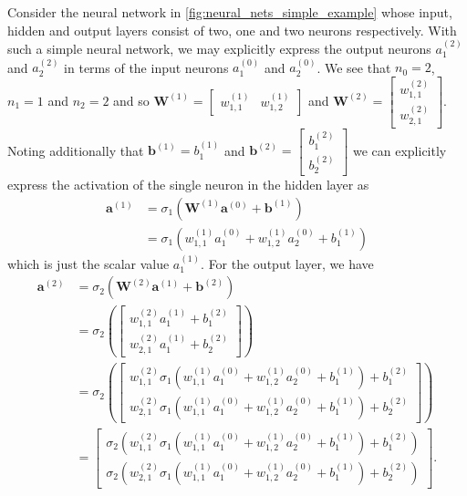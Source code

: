 \documentclass[11pt]{article}
\begin{document}
\noindent Consider the neural network in \autoref{fig:neural_nets_simple_example} whose input, hidden and output layers consist of two, one and two neurons respectively. With such a simple neural network, we may explicitly express the output neurons $a_1^{(2)}$ and $a_2^{(2)}$ in terms of the input neurons $a_1^{(0)}$ and $a_2^{(0)}$. We see that $n_0=2$, $n_1=1$ and $n_2=2$ and so
$\mathbf{W}^{(1)}=
\begin{bmatrix}
    w_{1,1}^{(1)} & w_{1,2}^{(1)}
\end{bmatrix}
$
and
$\mathbf{W}^{(2)}=
\begin{bmatrix}
    w_{1,1}^{(2)}\\
    w_{2,1}^{(2)}
\end{bmatrix}.
$
Noting additionally that $\mathbf{b}^{(1)}=b_1^{(1)}$ and
$\mathbf{b}^{(2)}=
\begin{bmatrix}
    b_{1}^{(2)}\\
    b_{2}^{(2)}
\end{bmatrix}$
we can explicitly express the activation of the single neuron in the hidden layer as
\begin{align*}
\mathbf{a}^{(1)}
&=
\sigma_1\left(\mathbf{W}^{(1)}\mathbf{a}^{(0)}+\mathbf{b}^{(1)}\right)\\
&=
\sigma_1\left(w_{1,1}^{(1)}a_1^{(0)}+w_{1,2}^{(1)}a_2^{(0)}+b_1^{(1)}\right)
\end{align*}
which is just the scalar value $a_1^{(1)}$. For the output layer, we have
\begin{align*}
\mathbf{a}^{(2)}
&=
\sigma_2\left(\mathbf{W}^{(2)}\mathbf{a}^{(1)}+\mathbf{b}^{(2)}\right)\\
&=
\sigma_2\left(
\begin{bmatrix}
    w_{1,1}^{(2)}a_1^{(1)} + b_1^{(2)}\\
    w_{2,1}^{(2)}a_1^{(1)} + b_2^{(2)}
\end{bmatrix}
\right)\\
&=
\sigma_2\left(
\begin{bmatrix}
    w_{1,1}^{(2)}\sigma_1\left(w_{1,1}^{(1)}a_1^{(0)}+w_{1,2}^{(1)}a_2^{(0)}+b_1^{(1)}\right) + b_1^{(2)}\\
    w_{2,1}^{(2)}\sigma_1\left(w_{1,1}^{(1)}a_1^{(0)}+w_{1,2}^{(1)}a_2^{(0)}+b_1^{(1)}\right) + b_2^{(2)}
\end{bmatrix}
\right)\\
&=
\begin{bmatrix}
    \sigma_2\left(w_{1,1}^{(2)}\sigma_1\left(w_{1,1}^{(1)}a_1^{(0)}+w_{1,2}^{(1)}a_2^{(0)}+b_1^{(1)}\right) + b_1^{(2)}\right)\\
    \sigma_2\left(w_{2,1}^{(2)}\sigma_1\left(w_{1,1}^{(1)}a_1^{(0)}+w_{1,2}^{(1)}a_2^{(0)}+b_1^{(1)}\right) + b_2^{(2)}\right)
\end{bmatrix}.
\end{align*}
\end{document}
